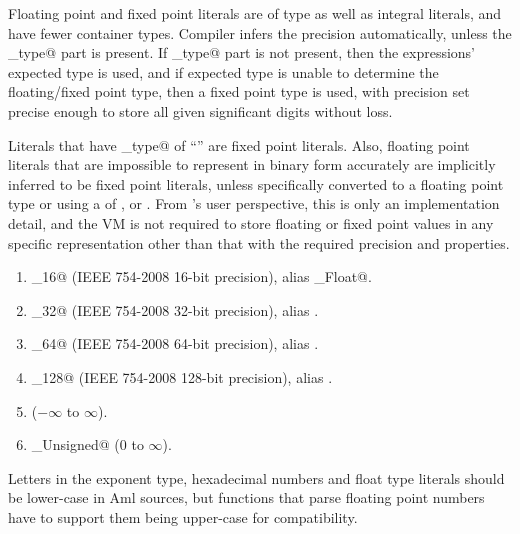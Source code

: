 Floating point and fixed point literals are of type \lstinline@Number@ as well as integral literals, and have fewer container types. Compiler infers the precision automatically, unless the \lstinline@float_type@ part is present. If \lstinline@float_type@ part is not present, then the expressions' expected type is used, and if expected type is unable to determine the floating/fixed point type, then a fixed point type is used, with precision set precise enough to store all given significant digits without loss. 

Literals that have \lstinline@float_type@ of ``'' are fixed point literals. Also, floating point literals that are impossible to represent in binary form accurately are implicitly inferred to be fixed point literals, unless specifically converted to a floating point type or using a  of ,  or . From 's user perspective, this is only an implementation detail, and the VM is not required to store floating or fixed point values in any specific representation other than that with the required precision and properties. 

\begin{enumerate}

  \item \lstinline@Float_16@ (IEEE 754-2008 16-bit precision), alias \lstinline@Half_Float@. 
  
  \item \lstinline@Float_32@ (IEEE 754-2008 32-bit precision), alias \lstinline@Float@. 

  \item \lstinline@Float_64@ (IEEE 754-2008 64-bit precision), alias \lstinline@Double@.

  \item \lstinline@Float_128@ (IEEE 754-2008 128-bit precision), alias \lstinline@Quadruple@.

  \item \lstinline@Decimal@ ($-\infty$ to $\infty$).

  \item \lstinline@Decimal_Unsigned@ ($0$ to $\infty$).

\end{enumerate}

Letters in the exponent type, hexadecimal numbers and float type literals should be lower-case in Aml sources, but functions that parse floating point numbers have to support them being upper-case for compatibility. 





